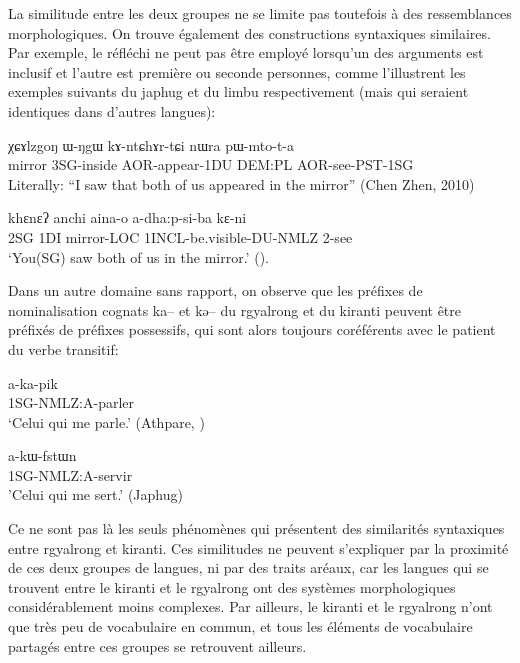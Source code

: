 \documentclass[oldfontcommands,oneside,a4paper,11pt]{memoir}
\begin{document}
La similitude entre les deux groupes ne se limite pas toutefois à des ressemblances morphologiques. On trouve également des constructions syntaxiques similaires. Par exemple, le réfléchi ne peut pas être employé lorsqu'un des arguments est inclusif et l'autre est première ou seconde personnes, comme l'illustrent les exemples suivants du japhug et du limbu respectivement (mais qui seraient identiques dans d'autres langues):

\begin{exe}
\ex \label{ex:refl1}
\gll	χɕɤlzgoŋ 	ɯ-ŋgɯ 		kɤ-ntɕhɤr-tɕi 	nɯra 	pɯ-mto-t-a \\
mirror		3SG-inside	AOR-appear-1DU	DEM:PL	AOR-see-PST-1SG \\
\glt	Literally: “I saw that both of us appeared in the mirror” (Chen Zhen, 2010)
\end{exe}

\begin{exe}
\ex \label{ex:refl2}
\gll
khɛnɛʔ	anchi	aina-o		a-dha:p-si-ba				kɛ-ni \\
	2SG		1DI		mirror-LOC	1INCL-be.visible-DU-NMLZ	2-see \\
\glt	‘You(SG) saw both of us in the mirror.’ (\citealt[277]{driem90hayu}).
\end{exe}

Dans un autre domaine sans rapport, on observe que les préfixes de nominalisation cognats ka-- et kə-- du rgyalrong et du kiranti peuvent être préfixés de préfixes possessifs, qui sont alors toujours coréférents avec le patient du verbe transitif:
\begin{exe}
\ex \label{ex:ka1}
\gll	a-ka-pik \\
1SG-NMLZ:A-parler \\
\glt ‘Celui qui me parle.’ (Athpare, \citealt[514]{ebert03kiranti})
\end{exe}

\begin{exe}
\ex \label{ex:ka2}
\gll	a-kɯ-fstɯn \\
1SG-NMLZ:A-servir \\
\glt 'Celui qui me sert.’ (Japhug)
\end{exe}

Ce ne sont pas là les seuls phénomènes qui présentent des similarités syntaxiques entre rgyalrong et kiranti. Ces similitudes ne peuvent s'expliquer par la proximité de ces deux groupes de langues, ni par des traits aréaux, car les langues qui se trouvent entre le kiranti et le rgyalrong ont des systèmes morphologiques considérablement moins complexes. Par ailleurs, le kiranti et le rgyalrong n'ont que très peu de vocabulaire en commun, et tous les éléments de vocabulaire partagés entre ces groupes se retrouvent ailleurs. 
\end{document}
